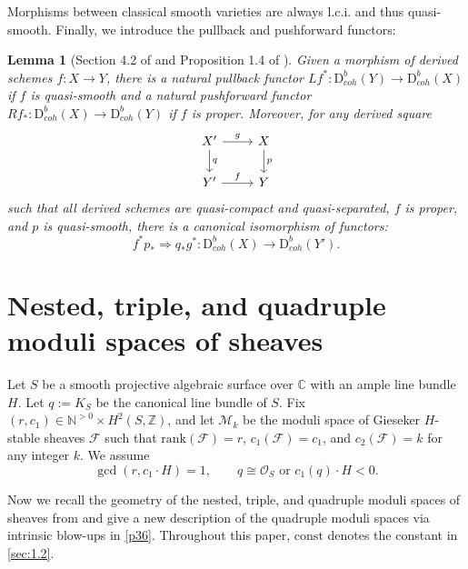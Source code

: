 \documentclass{amsart}
\numberwithin{equation}{section}
\newcommand\mc{\mathcal}
\newcommand\mb{\mathbb}
\newcommand{\rank}{\mathrm{rank}}
\newcommand{\D}{\mathrm{D}}
\newtheorem{lemma}[theorem]{Lemma}
\theoremstyle{definition}
\theoremstyle{remark}
\begin{document}
Morphisms between classical smooth varieties are always l.c.i. and thus quasi-smooth. Finally, we introduce the pullback and pushforward functors:
\begin{lemma}[Section 4.2 of \cite{porta2019categorification} and Proposition 1.4 of \cite{toen2012proper}]
  \label{n613}
Given a morphism of derived schemes $f:X\to Y$, there is a natural pullback functor $Lf^{*}:\D_{coh}^{b}(Y)\to \D_{coh}^{b}(X)$ if $f$ is quasi-smooth and a natural pushforward functor $Rf_{*}:\D_{coh}^{b}(X)\to \D_{coh}^{b}(Y)$ if $f$ is proper. Moreover, for any derived square
    \begin{equation*}
      \begin{tikzcd}
        X' \ar{r}{g}\ar{d}{q} & X \ar{d}{p}  \\
        Y' \ar{r}{f} & Y
      \end{tikzcd}
    \end{equation*}
  such that all derived schemes are quasi-compact and quasi-separated, $f$ is proper, and $p$ is quasi-smooth, there is a canonical isomorphism of functors:
  $$f^{*}p_{*}\Rightarrow q_{*}g^{*}: \D^{b}_{coh}(X)\to \D^{b}_{coh}(Y').$$
\end{lemma}

\section{Nested, triple, and quadruple moduli spaces of sheaves}
\label{sec:n}
Let $S$ be a smooth projective algebraic surface over $\mb{C}$ with an ample line bundle $H$. Let $q:=K_{S}$ be the canonical line bundle of $S$. Fix $(r,c_{1})\in \mb{N}^{>0}\times H^{2}(S,\mb{Z})$, and let $\mc{M}_k$ be the moduli space of Gieseker $H$-stable sheaves $\mc{F}$ such that $\rank(\mc{F})=r$, $c_{1}(\mc{F})=c_{1}$, and $c_{2}(\mc{F})=k$ for any integer $k$. We assume
 \begin{equation*}
  \gcd(r, c_{1}\cdot H) = 1,  \qquad  q \cong \mc{O}_S \text{ or } c_1(q) \cdot H < 0.
\end{equation*}

Now we recall the geometry of the nested, triple, and quadruple moduli spaces of sheaves from \cite{negut2017shuffle,neguct2018hecke} and give a new description of the quadruple moduli spaces via intrinsic blow-ups in \cref{p36}. Throughout this paper, $\mathrm{const}$ denotes the constant in \cref{sec:1.2}.
\end{document}
